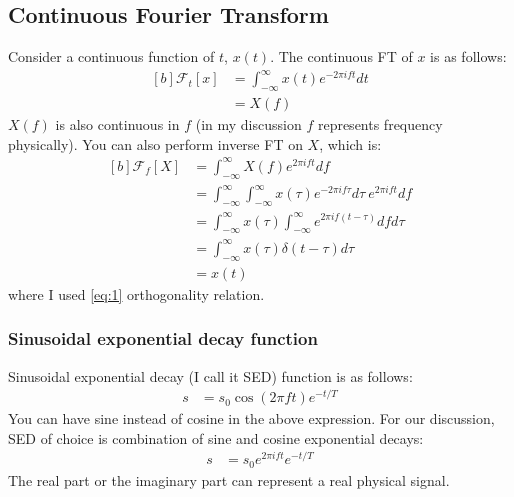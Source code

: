 \documentclass[letterpaper, 11pt]{article}
\newcommand{\fourier}[2]{\mathcal{F}_{#1}[#2]}
\newcommand{\fint}{\int_{-\infty}^{\infty}}
\numberwithin{equation}{section}
\begin{document}
\subsection{Continuous Fourier Transform}
Consider a continuous function of \(t\), \(x(t)\). The continuous FT of \(x\) is as follows:
\begin{equation}
	\begin{aligned}[b]
		\fourier{t}{x}	&= \fint x(t)e^{-2\pi ift} dt \\
				&= X(f)
	\end{aligned}
\end{equation}
\(X(f)\) is also continuous in \(f\) (in my discussion \(f\) represents frequency physically). You can also perform inverse FT on \(X\), which is:
\begin{equation}
	\begin{aligned}[b]
		\fourier{f}{X}	&= \fint X(f)e^{2\pi ift} df \\
				&= \fint \fint x(\tau)e^{-2\pi if\tau} d\tau\ e^{2\pi ift} df \\
				&= \fint x(\tau) \fint e^{2\pi if(t - \tau)} df d\tau \\
				&= \fint x(\tau) \delta (t - \tau) d\tau \\
				&= x(t)
	\end{aligned}
\end{equation}
where I used \eqref{eq:1} orthogonality relation.

\subsubsection{Sinusoidal exponential decay function}
Sinusoidal exponential decay (I call it SED) function is as follows:
\begin{align}
	s &= s_{0}\cos{(2\pi ft)}e^{-t/T}
\end{align}
You can have sine instead of cosine in the above expression. For our discussion, SED of choice is combination of sine and cosine exponential decays:
\begin{align}
	s &= s_{0}e^{2\pi ift}e^{-t/T}
\end{align}
The real part or the imaginary part can represent a real physical signal.
\printindex
\end{document}
